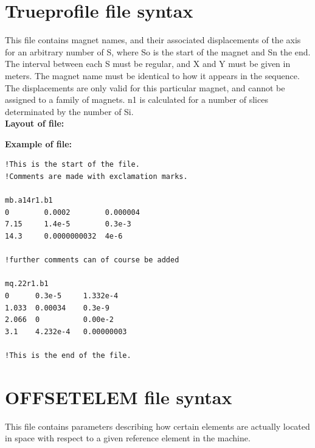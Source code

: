 \section{Trueprofile file syntax}
\label{sec:trueprofile}
This file contains magnet names, and their associated displacements of
the axis for  an arbitrary number of S, where So is the start of the
magnet and Sn the end. The interval between each S must be regular, and
X and Y  must be given in meters. The magnet name must be identical to
how it appears in the  sequence. The displacements are only valid for
this particular magnet, and cannot be  assigned to a family of
magnets. n1 is calculated for a number of slices determinated by the
number of Si. 
\\
{\bf Layout of file:}

{\bf Example of file:}
\begin{verbatim}
!This is the start of the file.
!Comments are made with exclamation marks.

mb.a14r1.b1
0        0.0002        0.000004
7.15     1.4e-5        0.3e-3
14.3     0.0000000032  4e-6

!further comments can of course be added

mq.22r1.b1
0      0.3e-5     1.332e-4
1.033  0.00034    0.3e-9
2.066  0          0.00e-2
3.1    4.232e-4   0.00000003

!This is the end of the file.
\end{verbatim}

\section{OFFSETELEM file syntax}
\label{sec:offsetelem}
This file contains parameters describing how certain elements are
actually located in space with respect to a given reference element in
the machine.  

